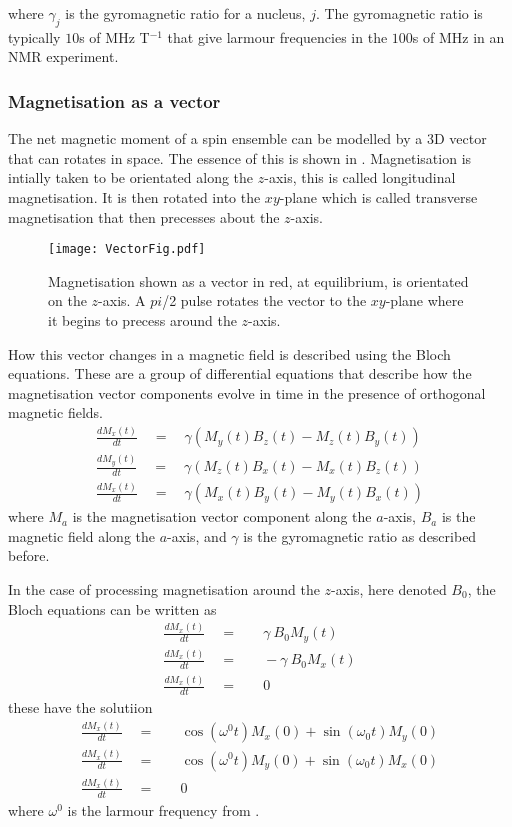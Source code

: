 where $\gamma_j$ is the gyromagnetic ratio for a nucleus, $j$. The gyromagnetic ratio is
typically $10$s of MHz T$^{-1}$ that give larmour frequencies in the $100$s of MHz in an NMR
experiment.

\subsubsection{Magnetisation as a vector}

The net magnetic moment of a spin ensemble can be modelled by a 3D vector that can rotates in space. The essence of this is shown in . Magnetisation is intially taken to be orientated along the $z$-axis, this is called longitudinal magnetisation. It is then rotated into the $xy$-plane which is called transverse
magnetisation that then precesses about the $z$-axis.

\begin{figure}
  \begin{center}
  \texttt{[image: VectorFig.pdf]}
  \end{center}
  \caption{Magnetisation shown as a vector in red, at equilibrium, is orientated on the $z$-axis. A $pi$/2
  pulse rotates the vector to the $xy$-plane where it begins to precess around the $z$-axis.}
  \label{fig:VectorFig}
\end{figure}

How this vector changes in a magnetic field is described using the Bloch equations\citep{Bloch:1946hk}. These are a group of differential equations that
describe how the magnetisation vector components evolve in time in the
presence of orthogonal magnetic fields.
\begin{align}\label{eqn:Bloch}
  \frac{dM_x(t)}{dt}\quad=\quad\gamma(M_y(t)B_z(t)-M_z(t)B_y(t))\\
  \frac{dM_y(t)}{dt}\quad=\quad\gamma(M_z(t)B_x(t)-M_x(t)B_z(t))\\
  \frac{dM_x(t)}{dt}\quad=\quad\gamma(M_x(t)B_y(t)-M_y(t)B_x(t))
\end{align}
where $M_a$ is the magnetisation vector component along the $a$-axis, $B_a$ is the
magnetic field along the $a$-axis, and $\gamma$ is the gyromagnetic ratio as described before.

In the case of processing magnetisation around the $z$-axis, here denoted $B_0$, the
Bloch equations can be written as
\begin{align}
  \frac{dM_x(t)}{dt}\quad=&\quad\gamma~B_0M_y(t)\\
  \frac{dM_x(t)}{dt}\quad=&\quad-\gamma~B_0M_x(t)\\
  \frac{dM_x(t)}{dt}\quad=&\quad0
\end{align}
these have the solutiion
\begin{align}
  \frac{dM_x(t)}{dt}\quad=&\quad\cos(\omega^0t)M_x(0) + \sin(\omega_0t)M_y(0)\\
  \frac{dM_x(t)}{dt}\quad=&\quad\cos(\omega^0t)M_y(0) + \sin(\omega_0t)M_x(0)\\
  \frac{dM_x(t)}{dt}\quad=&\quad0
\end{align}
where $\omega^0$ is the larmour frequency from .

